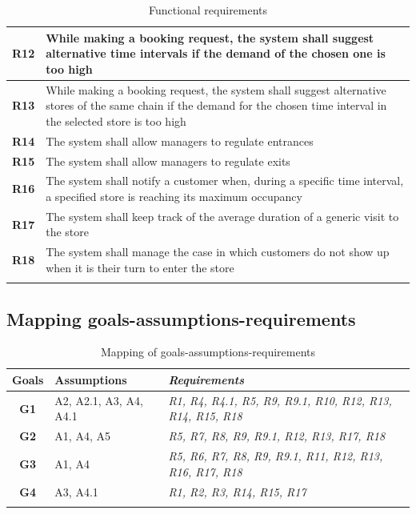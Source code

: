 \documentclass[a4paper,oneside,11pt]{book}   %
\begin{document}
\begin{longtable}[c]{|>{\bfseries{}}c|H{.65\textwidth}|}
        R12  & While making a booking request, the system shall suggest alternative time intervals if the demand of the chosen one is too high \\ \hline
        R13  & While making a booking request, the system shall suggest alternative stores of the same chain if the demand for the chosen time interval in the selected store is too high \\ \hline
        R14  & The system shall allow managers to regulate entrances  \\ \hline
        R15  & The system shall allow managers to regulate exits \\ \hline
        R16  & The system shall notify a customer when, during a specific time interval, a specified store is reaching its maximum occupancy \\ \hline
        R17  & The system shall keep track of the average duration of a generic visit to the store \\ \hline
        R18  & The system shall manage the case in which customers do not show up when it is their turn to enter the store \\ \hline
        \caption{Functional requirements}
        \label{table:functional_requirements}
    \end{longtable}
    
    \newpage
    \subsection{Mapping goals-assumptions-requirements}
    \begin{longtable}[c] { |>{\bfseries{}}c|P{0.22\textwidth}|>{\em}H{0.40\textwidth}| }
        \hline
        \textbf{Goals} & \textbf{Assumptions} & \emph{\textbf{Requirements}} \\
        \hline
        G1 & A2, A2.1, A3, A4, A4.1 & R1, R4, R4.1, R5, R9, R9.1, R10, R12, R13, R14, R15, R18 \\ \hline
        G2 & A1, A4, A5       & R5, R7, R8, R9, R9.1, R12, R13, R17, R18 \\ \hline
        G3 & A1, A4           & R5, R6, R7, R8, R9, R9.1, R11, R12, R13, R16, R17, R18 \\ \hline
        G4 & A3, A4.1         & R1, R2, R3, R14, R15, R17 \\
        \hline
        \caption{Mapping of goals-assumptions-requirements}
        \label{table:map_goals_assumptions_requirements}
    \end{longtable}
\end{document}
